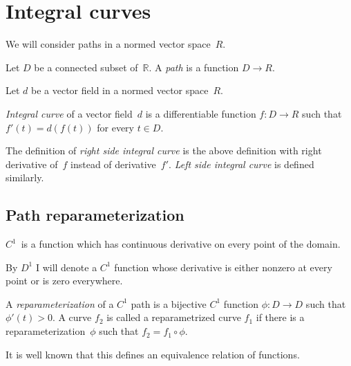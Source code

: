 \section{Integral curves}


We will consider paths in a normed vector space~$R$.

\begin{defn}
Let $D$ be a connected subset of~$\mathbb{R}$. A \emph{path} is a function $D\rightarrow R$.
\end{defn}

Let $d$ be a vector field in a normed vector space~$R$.


\begin{defn}
\emph{Integral curve} of a vector field~$d$ is a differentiable function $f:D\rightarrow R$ such that $f'(t)=d(f(t))$ for every $t\in D$.
\end{defn}

\begin{defn}
The definition of \emph{right side integral curve} is the above definition with right derivative of~$f$ instead of derivative~$f'$.
\emph{Left side integral curve} is defined similarly.
\end{defn}

\subsection{Path reparameterization}

$C^1$~is a function which has continuous derivative on every point of the domain.

By $D^1$ I will denote a $C^1$ function whose derivative is either nonzero at every point or is zero everywhere.

\begin{defn}
A \emph{reparameterization} of a $C^1$ path is a bijective $C^1$ function $\phi:D\rightarrow D$ such that
$\phi'(t)>0$. A curve $f_2$ is called a reparametrized curve $f_1$ if there is a reparameterization~$\phi$ such that
$f_2=f_1\circ\phi$.
\end{defn}

It is well known that this defines an equivalence relation of functions.


